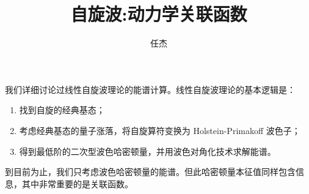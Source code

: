 \documentclass[UTF8]{ctexart}
\begin{document}
\title{自旋波:动力学关联函数}
\author{任杰}
\date{}

\maketitle
\noindent
我们详细讨论过线性自旋波理论的能谱计算。线性自旋波理论的基本逻辑是：
\begin{enumerate}
\item 找到自旋的经典基态；
\item 考虑经典基态的量子涨落，将自旋算符变换为 Holstein-Primakoff 波色子；
\item 得到最低阶的二次型波色哈密顿量，并用波色对角化技术求解能谱。
\end{enumerate}
到目前为止，我们只考虑波色哈密顿量的能谱。但此哈密顿量本征值同样包含信息，其中非常重要的是关联函数。
\end{document}

